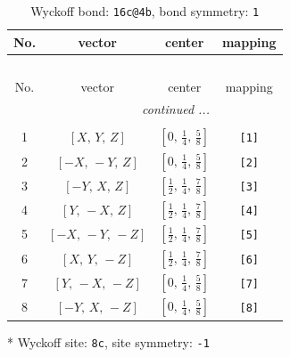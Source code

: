 \documentclass[fleqn,8pt]{jsarticle}
\begin{document}
\renewcommand{\arraystretch}{1.2}
\begin{longtable}{cccc}
\caption{Wyckoff bond: {\tt 16c@4b}, bond symmetry: {\tt 1}}
 \\
 \hline \hline
No. & vector & center & mapping \\ \hline \endfirsthead

\multicolumn{3}{l}{\tablename\ \thetable{}} \\
 \hline \hline
No. & vector & center & mapping \\ \hline \endhead

 \hline \hline
\multicolumn{3}{r}{\footnotesize\it continued ...} \\ \endfoot

 \hline \hline
\multicolumn{3}{r}{} \\ \endlastfoot

1 & $\left[ X,\, Y,\, Z \right]$ & $\left[ 0,\, \frac{1}{4},\, \frac{5}{8} \right]$ & {\tt [1]} \\ \hline
2 & $\left[ - X,\, - Y,\, Z \right]$ & $\left[ 0,\, \frac{1}{4},\, \frac{5}{8} \right]$ & {\tt [2]} \\ \hline
3 & $\left[ - Y,\, X,\, Z \right]$ & $\left[ \frac{1}{2},\, \frac{1}{4},\, \frac{7}{8} \right]$ & {\tt [3]} \\ \hline
4 & $\left[ Y,\, - X,\, Z \right]$ & $\left[ \frac{1}{2},\, \frac{1}{4},\, \frac{7}{8} \right]$ & {\tt [4]} \\ \hline
5 & $\left[ - X,\, - Y,\, - Z \right]$ & $\left[ \frac{1}{2},\, \frac{1}{4},\, \frac{7}{8} \right]$ & {\tt [5]} \\ \hline
6 & $\left[ X,\, Y,\, - Z \right]$ & $\left[ \frac{1}{2},\, \frac{1}{4},\, \frac{7}{8} \right]$ & {\tt [6]} \\ \hline
7 & $\left[ Y,\, - X,\, - Z \right]$ & $\left[ 0,\, \frac{1}{4},\, \frac{5}{8} \right]$ & {\tt [7]} \\ \hline
8 & $\left[ - Y,\, X,\, - Z \right]$ & $\left[ 0,\, \frac{1}{4},\, \frac{5}{8} \right]$ & {\tt [8]} \\
\end{longtable}
* Wyckoff site: {\tt 8c}, site symmetry: {\tt -1}
\renewcommand{\arraystretch}{1.2}
\end{document}
